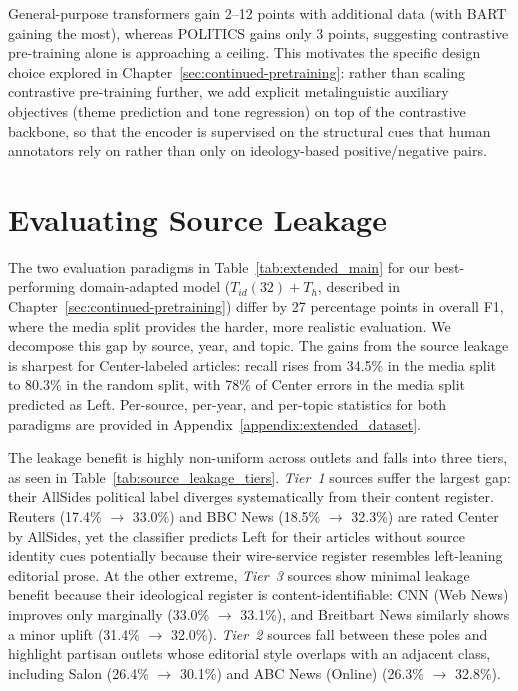 General-purpose transformers gain 2--12 points with additional data (with BART gaining the most), whereas POLITICS gains only 3 points, suggesting contrastive pre-training alone is approaching a ceiling. This motivates the specific design choice explored in Chapter~\ref{sec:continued-pretraining}: rather than scaling contrastive pre-training further, we add explicit metalinguistic auxiliary objectives (theme prediction and tone regression) on top of the contrastive backbone, so that the encoder is supervised on the structural cues that human annotators rely on rather than only on ideology-based positive/negative pairs.

\section{Evaluating Source Leakage}
\label{sec:source-leakage}

The two evaluation paradigms in Table~\ref{tab:extended_main} for our best-performing domain-adapted model ($T_{id}(32){+}T_h$, described in Chapter~\ref{sec:continued-pretraining}) differ by 27 percentage points in overall F1, where the media split provides the harder, more realistic evaluation. We decompose this gap by source, year, and topic. The gains from the source leakage is sharpest for Center-labeled articles: recall rises from 34.5\% in the media split to 80.3\% in the random split, with 78\% of Center errors in the media split predicted as Left. Per-source, per-year, and per-topic statistics for both paradigms are provided in Appendix~\ref{appendix:extended_dataset}.

The leakage benefit is highly non-uniform across outlets and falls into three tiers, as seen in Table~\ref{tab:source_leakage_tiers}. \emph{Tier~1} sources suffer the largest gap: their AllSides political label diverges systematically from their content register. Reuters (17.4\% $\to$ 33.0\%) and BBC News (18.5\% $\to$ 32.3\%) are rated Center by AllSides, yet the classifier predicts Left for their articles without source identity cues potentially because their wire-service register resembles left-leaning editorial prose. At the other extreme, \emph{Tier~3} sources show minimal leakage benefit because their ideological register is content-identifiable: CNN (Web News) improves only marginally (33.0\% $\to$ 33.1\%), and Breitbart News similarly shows a minor uplift (31.4\% $\to$ 32.0\%). \emph{Tier~2} sources fall between these poles and highlight partisan outlets whose editorial style overlaps with an adjacent class, including Salon (26.4\% $\to$ 30.1\%) and ABC News (Online) (26.3\% $\to$ 32.8\%).

